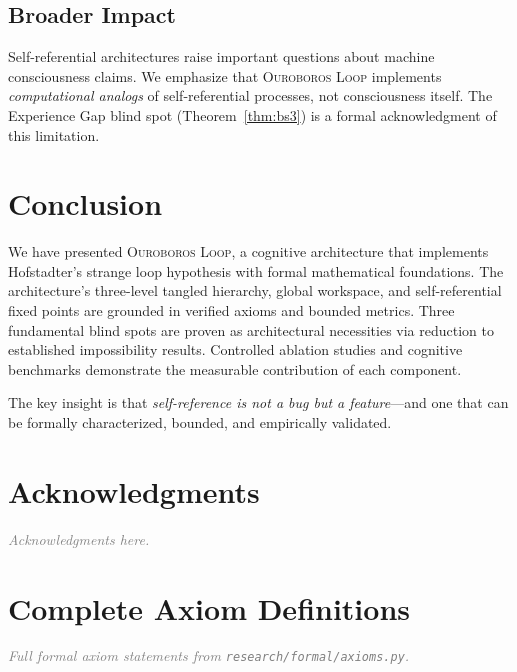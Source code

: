 \documentclass[11pt,a4paper]{article}
\newcommand{\OL}{\textsc{Ouroboros Loop}}
\newcommand{\placeholder}[1]{\textcolor{gray}{\textit{#1}}}
\begin{document}
\subsection{Broader Impact}

Self-referential architectures raise important questions about machine
consciousness claims. We emphasize that \OL{} implements
\emph{computational analogs} of self-referential processes, not
consciousness itself. The Experience Gap blind spot (Theorem~\ref{thm:bs3})
is a formal acknowledgment of this limitation.

\section{Conclusion}
\label{sec:conclusion}

We have presented \OL{}, a cognitive architecture that implements
Hofstadter's strange loop hypothesis with formal mathematical
foundations. The architecture's three-level tangled hierarchy, global
workspace, and self-referential fixed points are grounded in verified
axioms and bounded metrics. Three fundamental blind spots are proven
as architectural necessities via reduction to established impossibility
results. Controlled ablation studies and cognitive benchmarks
demonstrate the measurable contribution of each component.

The key insight is that \emph{self-reference is not a bug but a
feature}---and one that can be formally characterized, bounded, and
empirically validated.

\section*{Acknowledgments}
\placeholder{Acknowledgments here.}




\appendix

\section{Complete Axiom Definitions}
\label{app:axioms}

\placeholder{Full formal axiom statements from
\texttt{research/formal/axioms.py}.}
\end{document}
